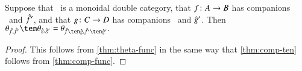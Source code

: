 \documentclass{amsart}
\begin{document}
\begin{lem}\label{thm:theta-ten}
  Suppose that \lD\ is a monoidal double category, that $f\colon A\to
  B$ has companions \fhat\ and $\hat{f}'$, and that $g\colon C\to D$ has
  companions \ghat\ and $\hat{g}'$.  Then $\theta_{\fhat,\fhat'} \ten
  \theta_{\ghat,\ghat'} = \theta_{\fhat\ten \ghat, \fhat'\ten\ghat'}.$
\end{lem}
\begin{proof}
  This follows from \autoref{thm:theta-func} in the same way that
  \autoref{thm:comp-ten} follows from \autoref{thm:comp-func}.

\end{proof}
\end{document}
